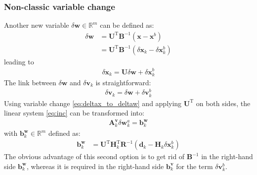 \documentclass[12pt]{scrartcl}
\begin{document}
\subsubsection{Non-classic variable change}
Another new variable $\delta \mathbf{w} \in \mathbb{R}^m$ can be defined as:
\begin{align}
\delta \mathbf{w} & = \mathbf{U}^\mathrm{T} \mathbf{B}^{-1} \left(\mathbf{x} - \mathbf{x}^b\right) \nonumber \\
 & = \mathbf{U}^\mathrm{T} \mathbf{B}^{-1} \left(\delta \mathbf{x}_k - \delta \mathbf{x}^b_k\right)
\end{align}
leading to
\begin{align}
\label{eq:deltax_to_deltaw}
\boxed{\delta \mathbf{x}_k = \mathbf{U} \delta \mathbf{w} + \delta \mathbf{x}^b_k}
\end{align}
The link between $\delta \mathbf{w}$ and $\delta \mathbf{v}_k$ is straightforward:
\begin{align}
\label{eq:link_deltaw-deltav}
\delta \mathbf{v}_k = \delta \mathbf{w} + \delta \mathbf{v}^b_k
\end{align}
Using variable change \eqref{eq:deltax_to_deltaw} and applying $\mathbf{U}^\mathrm{T}$ on both sides, the linear system \eqref{eq:inc} can be transformed into:
\begin{align}
\label{eq:inc_U_w}
\boxed{\mathbf{A}^\mathbf{v}_k \delta \mathbf{w}^a_k = \mathbf{b}^\mathbf{w}_k}
\end{align}
with $\mathbf{b}^\mathbf{w}_k \in \mathbb{R}^{m}$ defined as:
\begin{align}
\mathbf{b}^\mathbf{w}_k & = \mathbf{U}^\mathrm{T} \mathbf{H}_k^\mathrm{T} \mathbf{R}^{-1} \left(\mathbf{d}_k - \mathbf{H}_k \delta \mathbf{x}^b_k\right)
\end{align}
The obvious advantage of this second option is to get rid of $\mathbf{B}^{-1}$ in the right-hand side $\mathbf{b}^\mathbf{w}_k$, whereas it is required in the right-hand side $\mathbf{b}^\mathbf{v}_k$ for the term $\delta \mathbf{v}^b_k$.
\end{document}
